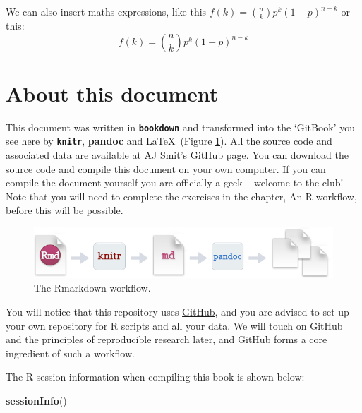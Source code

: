 \documentclass[]{book}
\newenvironment{Shaded}{\begin{snugshade}}{\end{snugshade}}
\newcommand{\KeywordTok}[1]{\textcolor[rgb]{0.13,0.29,0.53}{\textbf{#1}}}
\newcommand{\NormalTok}[1]{#1}
\theoremstyle{definition}
\theoremstyle{definition}
\theoremstyle{definition}
\theoremstyle{remark}
\begin{document}
We can also insert maths expressions, like this
\(f(k) = {n \choose k} p^{k} (1-p)^{n-k}\) or this:
\[f(k) = {n \choose k} p^{k} (1-p)^{n-k}\]

\section{About this document}\label{about-this-document}

This document was written in \textbf{\texttt{bookdown}} and transformed
into the `GitBook' you see here by \textbf{\texttt{knitr}},
\textbf{pandoc} and \LaTeX~(Figure \ref{fig:rmarkdown}). All the source
code and associated data are available at AJ Smit's
\href{https://github.com/ajsmit/Intro_R_Workshop}{GitHub page}. You can
download the source code and compile this document on your own computer.
If you can compile the document yourself you are officially a geek --
welcome to the club! Note that you will need to complete the exercises
in the chapter, An R workflow, before this will be possible.

\begin{figure}

{\centering \includegraphics[width=1\linewidth]{figures/RMarkdownFlow} 

}

\caption{The Rmarkdown workflow.}\label{fig:rmarkdown}
\end{figure}

You will notice that this repository uses
\href{https://github.com}{GitHub}, and you are advised to set up your
own repository for R scripts and all your data. We will touch on GitHub
and the principles of reproducible research later, and GitHub forms a
core ingredient of such a workflow.

The R session information when compiling this book is shown below:

\begin{Shaded}
\begin{Highlighting}[]
\KeywordTok{sessionInfo}\NormalTok{()}
\end{Highlighting}
\end{Shaded}
\end{document}
